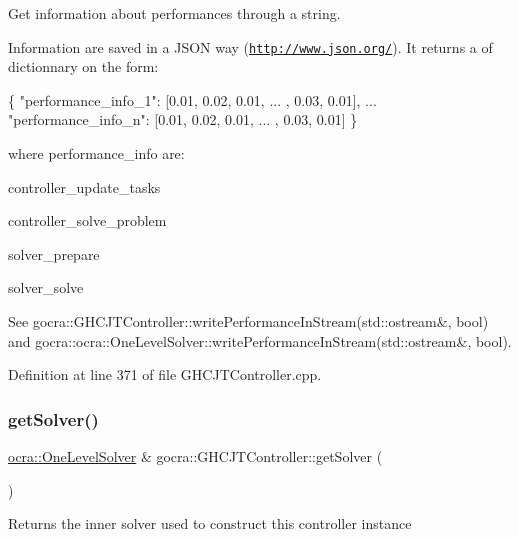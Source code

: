 Get information about performances through a string.

Information are saved in a J\+S\+ON way (\href{http://www.json.org/}{\tt http\+://www.\+json.\+org/}). It returns a of dictionnary on the form\+:


\begin{DoxyCode}
\{
   \textcolor{stringliteral}{"performance\_info\_1"}: [0.01, 0.02, 0.01, ... , 0.03, 0.01],
   ...
   \textcolor{stringliteral}{"performance\_info\_n"}: [0.01, 0.02, 0.01, ... , 0.03, 0.01]
\}
\end{DoxyCode}


where performance\+\_\+info are\+:


\begin{DoxyItemize}
\item controller\+\_\+update\+\_\+tasks
\item controller\+\_\+solve\+\_\+problem
\item solver\+\_\+prepare
\item solver\+\_\+solve
\end{DoxyItemize}

See gocra\+::\+G\+H\+C\+J\+T\+Controller\+::write\+Performance\+In\+Stream(std\+::ostream\&, bool) and gocra\+::ocra\+::\+One\+Level\+Solver\+::write\+Performance\+In\+Stream(std\+::ostream\&, bool). 

Definition at line 371 of file G\+H\+C\+J\+T\+Controller.\+cpp.

\hypertarget{classgocra_1_1GHCJTController_a25b8ce2edaa3fccc38dfa81900353856}{}\label{classgocra_1_1GHCJTController_a25b8ce2edaa3fccc38dfa81900353856} 
\subsubsection{\texorpdfstring{get\+Solver()}{getSolver()}}
{\footnotesize\ttfamily \hyperlink{classocra_1_1OneLevelSolver}{ocra\+::\+One\+Level\+Solver} \& gocra\+::\+G\+H\+C\+J\+T\+Controller\+::get\+Solver (\begin{DoxyParamCaption}{ }\end{DoxyParamCaption})}

\begin{DoxyReturn}{Returns}
the inner solver used to construct this controller instance 
\end{DoxyReturn}


